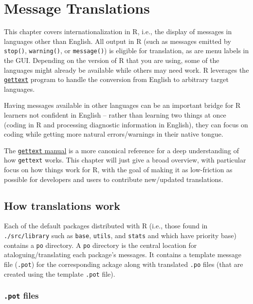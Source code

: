 \documentclass[
  letterpaper,
  DIV=11,
  numbers=noendperiod]{scrreprt}
\begin{document}

\chapter{Message Translations}\label{message-translations}

This chapter covers internationalization in R, i.e., the display of
messages in languages other than English. All output in R (such as
messages emitted by \texttt{stop()}, \texttt{warning()}, or
\texttt{message()}) is eligible for translation, as are menu labels in
the GUI. Depending on the version of R that you are using, some of the
languages might already be available while others may need work. R
leverages the
\href{https://www.gnu.org/software/gettext/}{\texttt{gettext}} program
to handle the conversion from English to arbitrary target languages.

Having messages available in other languages can be an important bridge
for R learners not confident in English -- rather than learning two
things at once (coding in R and processing diagnostic information in
English), they can focus on coding while getting more natural
errors/warnings in their native tongue.

The
\href{https://www.gnu.org/software/gettext/manual/index.html}{\texttt{gettext}
manual} is a more canonical reference for a deep understanding of how
\texttt{gettext} works. This chapter will just give a broad overview,
with particular focus on how things work for R, with the goal of making
it as low-friction as possible for developers and users to contribute
new/updated translations.

\section{How translations work}\label{how-translations-work}

Each of the default packages distributed with R (i.e., those found in
\texttt{./src/library} such as \texttt{base}, \texttt{utils}, and
\texttt{stats} and which have priority base) contains a \texttt{po}
directory. A \texttt{po} directory is the central location for
ataloguing/translating each package's messages. It contains a template
message file (\texttt{.pot}) for the corresponding ackage along with
translated \texttt{.po} files (that are created using the template
\texttt{.pot} file).

\subsection{\texorpdfstring{\texttt{.pot}
files}{.pot files}}\label{pot-files}
\end{document}
